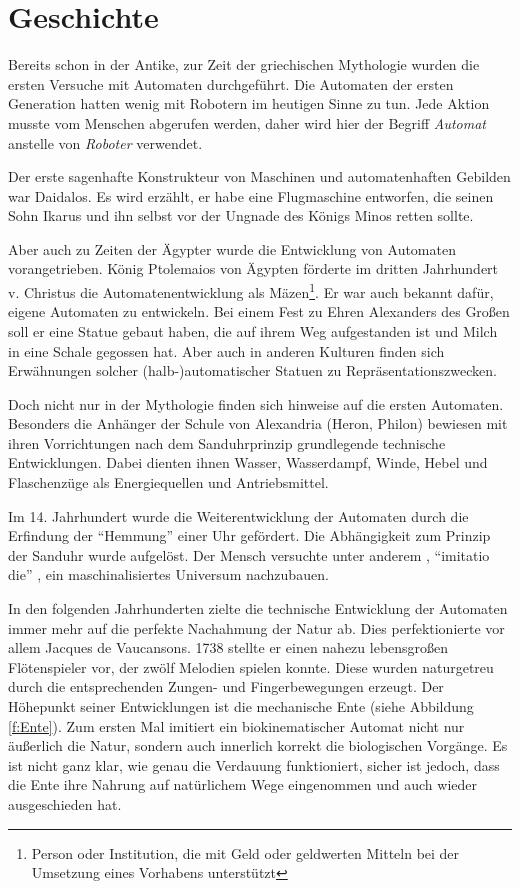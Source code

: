 \section{Geschichte}
Bereits schon in der Antike, zur Zeit der griechischen Mythologie wurden die ersten Versuche mit Automaten durchgeführt. Die Automaten der ersten Generation hatten wenig mit Robotern im heutigen Sinne zu tun. Jede Aktion musste vom Menschen abgerufen werden, daher wird hier der Begriff \textit{Automat} anstelle von \textit{Roboter} verwendet.

Der erste sagenhafte Konstrukteur von Maschinen und automatenhaften Gebilden war Daidalos. Es wird erzählt, er habe eine Flugmaschine entworfen, die seinen Sohn Ikarus und ihn selbst vor der Ungnade des Königs Minos retten sollte. 

Aber auch zu Zeiten der Ägypter wurde die Entwicklung von Automaten vorangetrieben. König Ptolemaios von Ägypten förderte im dritten Jahrhundert v. Christus die Automatenentwicklung als Mäzen\footnote{Person oder Institution, die mit Geld oder geldwerten Mitteln bei der Umsetzung eines Vorhabens unterstützt}. Er war auch bekannt dafür, eigene Automaten zu entwickeln. Bei einem Fest zu Ehren Alexanders des Großen soll er eine Statue gebaut haben, die auf ihrem Weg aufgestanden ist und Milch in eine Schale gegossen hat. Aber auch in anderen Kulturen finden sich Erwähnungen solcher (halb-)automatischer Statuen zu Repräsentationszwecken.

Doch nicht nur in der Mythologie finden sich hinweise auf die ersten Automaten. Besonders die Anhänger der Schule von Alexandria (Heron, Philon) bewiesen mit ihren Vorrichtungen nach dem Sanduhrprinzip grundlegende technische Entwicklungen. Dabei dienten ihnen Wasser, Wasserdampf, Winde, Hebel und Flaschenzüge als Energiequellen und Antriebsmittel.

Im 14. Jahrhundert wurde die Weiterentwicklung der Automaten durch die Erfindung der "`Hemmung"' einer Uhr gefördert. Die Abhängigkeit zum Prinzip der Sanduhr wurde aufgelöst. Der Mensch versuchte unter anderem , "`imitatio die"' , ein maschinalisiertes Universum nachzubauen. 

In den folgenden Jahrhunderten zielte die technische Entwicklung der Automaten immer mehr auf die perfekte Nachahmung der Natur  ab. Dies perfektionierte vor allem Jacques de Vaucansons. 1738 stellte er einen nahezu lebensgroßen Flötenspieler vor, der zwölf Melodien spielen konnte. Diese wurden naturgetreu durch die entsprechenden Zungen- und Fingerbewegungen erzeugt. Der Höhepunkt seiner Entwicklungen ist die mechanische Ente (siehe Abbildung \ref{f:Ente}). Zum ersten Mal imitiert ein biokinematischer Automat nicht nur äußerlich die Natur, sondern auch innerlich korrekt die biologischen Vorgänge. Es ist nicht ganz klar, wie genau die Verdauung funktioniert, sicher ist jedoch, dass die Ente ihre Nahrung auf natürlichem Wege eingenommen und auch wieder ausgeschieden hat.  

